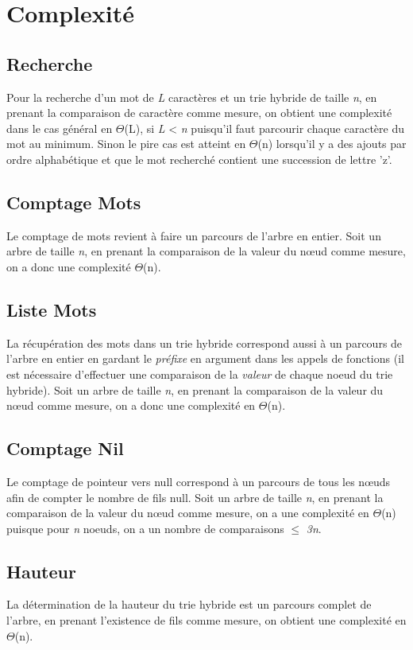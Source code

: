 \documentclass[a4paper,12pt]{report}
\begin{document}
\section{Complexité}
\subsection{Recherche}
Pour la recherche d'un mot de \textit{L} caractères et un trie hybride de taille \textit{n}, 
en prenant la comparaison de caractère comme mesure, on obtient une complexité dans le cas général en $\Theta$(L), si \textit{L} < \textit{n}
puisqu'il faut parcourir chaque caractère du mot au minimum. Sinon le pire cas est atteint en $\Theta$(n) lorsqu'il y a des
ajouts par ordre alphabétique et que le mot recherché contient une succession de lettre 'z'.

\subsection{Comptage Mots}
Le comptage de mots revient à faire un parcours de l'arbre en entier.
Soit un arbre de taille \textit{n}, en prenant la comparaison de la valeur du nœud comme mesure,
on a donc une complexité $\Theta$(n).

\subsection{Liste Mots}
La récupération des mots dans un trie hybride correspond aussi à un parcours de l'arbre en entier en gardant le \textit{préfixe}
en argument dans les appels de fonctions (il est nécessaire d'effectuer une comparaison de la \textit{valeur} de chaque noeud du
trie hybride).
Soit un arbre de taille \textit{n}, en prenant la comparaison de la valeur du nœud comme mesure,
on a donc une complexité en $\Theta$(n).

\subsection{Comptage Nil}
Le comptage de pointeur vers null correspond à un parcours de tous les nœuds afin de compter le nombre de fils null.
Soit un arbre de taille \textit{n}, en prenant la comparaison de la valeur du nœud comme mesure,
on a une complexité en $\Theta$(n) puisque pour \textit{n} noeuds, on a un nombre de comparaisons $\le$ \textit{3n}.

\subsection{Hauteur}
La détermination de la hauteur du trie hybride est un parcours complet de l'arbre, en prenant l'existence de fils comme mesure, on obtient une complexité en $\Theta$(n).
\end{document}
